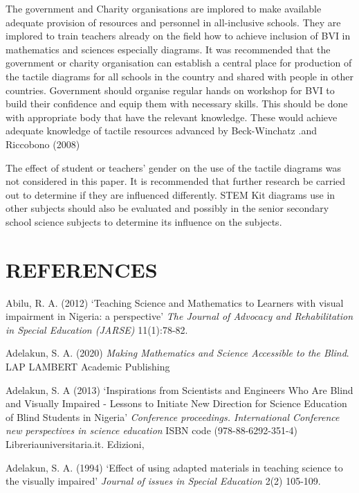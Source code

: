 \documentclass[11.5pt]{sig-alternate} %
\begin{document}
\begin{large}
The government and Charity organisations are implored to make available adequate provision of resources and personnel in all-inclusive schools. They are implored to train teachers already on the field how to achieve inclusion of BVI in mathematics and sciences especially diagrams. It was recommended that the government or charity organisation can establish a central place for production of the tactile diagrams for all schools in the country and shared with people in other countries. Government should organise regular hands on workshop for BVI to build their confidence and equip them with necessary skills. This should be done with appropriate body that have the relevant knowledge. These would achieve adequate knowledge of tactile resources advanced by Beck-Winchatz .and Riccobono (2008)

The effect of student or teachers’ gender on the use of the tactile diagrams was not considered in this paper. It is recommended that further research be carried out to determine if they are influenced differently. STEM Kit diagrams use in other subjects should also be evaluated and possibly in the senior secondary school science subjects to determine its influence on the subjects. 

\end{large}
\clearpage
\section*{REFERENCES}\par 

\leftskip 0.25in
\parindent -0.25in 

Abilu, R. A. (2012) ‘Teaching Science and Mathematics to Learners with visual impairment in Nigeria: a perspective’ \textit{The Journal of Advocacy and Rehabilitation in Special Education (JARSE)} 11(1):78-82.

Adelakun, S. A. (2020) \textit{Making Mathematics and Science Accessible to the Blind}. LAP LAMBERT Academic Publishing

Adelakun, S. A (2013) ‘Inspirations from Scientists and Engineers Who Are Blind and Visually Impaired - Lessons to Initiate New Direction for Science Education of Blind Students in Nigeria’ \textit{Conference proceedings. International Conference new perspectives in science education} ISBN code (978-88-6292-351-4) Libreriauniversitaria.it. Edizioni,

Adelakun, S. A. (1994) ‘Effect of using adapted materials in teaching science to the visually impaired’ \textit{Journal of issues in Special Education} 2(2) 105-109.
\end{document}
